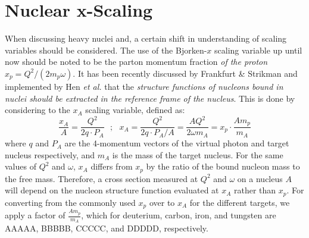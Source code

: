 \section{Nuclear x-Scaling}

When discussing heavy nuclei and, a certain shift in understanding of scaling variables should be considered. The use of the Bjorken-$x$ scaling variable up until now should be noted to be the parton momentum fraction \emph{of the proton} $x_p = Q^2/(2 m_p \omega)$. It has been recently discussed by Frankfurt \& Strikman\cite{Frankfurt:2012qs} and implemented by Hen \emph{et al.}\cite{Hen:2013oha} that the \emph{structure functions of nucleons bound in nuclei should be extracted in the reference frame of the nucleus}. This is done by considering to the $x_A$ scaling variable, defined as:
\begin{equation}
\frac{x_A}{A} = \frac{Q^2}{2q\cdot P_A} \ \ \ ;\ \ \ x_A = \frac{Q^2}{2q\cdot P_A/A} = \frac{AQ^2}{2\omega m_A} = x_p \cdot \frac{A m_p}{m_A}
\end{equation}
where $q$ and $P_A$ are the 4-momentum vectors of the virtual photon and target nucleus respectively, and $m_A$ is the mass of the target nucleus. For the same values of $Q^2$ and $\omega$, $x_A$ differs from $x_p$ by the ratio of the bound nucleon mass to the free mass. Therefore, a cross section measured at $Q^2$ and $\omega$ on a nucleus $A$ will depend on the nucleon structure function evaluated at $x_A$ rather than $x_p$. For converting from the commonly used $x_p$ over to $x_A$ for the different targets, we apply a factor of $\frac{A m_p}{m_A}$, which for deuterium, carbon, iron, and tungsten are AAAAA, BBBBB, CCCCC, and DDDDD, respectively.

